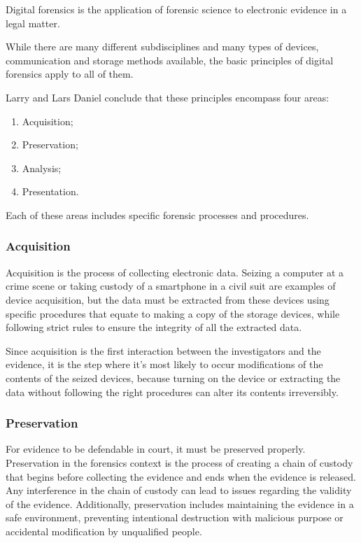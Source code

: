 Digital forensics is the application of forensic science to electronic evidence in a
legal matter.

While there are many different subdisciplines and many types of devices, communication
and storage methods available, the basic principles of digital forensics
apply to all of them.

Larry and Lars Daniel \cite{daniels} conclude that these principles encompass four areas:

\begin{enumerate}
\item Acquisition;
\item Preservation;
\item Analysis;
\item Presentation.
\end{enumerate}

Each of these areas includes specific forensic processes and procedures.

\subsubsection*{Acquisition}

Acquisition is the process of collecting electronic data. Seizing a computer at a crime scene or
taking custody of a smartphone in a civil suit are examples of device acquisition, but the data 
must be extracted from these devices using specific procedures that equate to making a copy of
the storage devices, while following strict rules to ensure the integrity of all the extracted data.

Since acquisition is the first interaction between the investigators and the evidence,
it is the step where it's most likely to occur modifications of the contents of the seized devices,
because turning on the device or extracting the data without following the right procedures can alter
its contents irreversibly.

\subsubsection*{Preservation}

For evidence to be defendable in court, it must be preserved properly.
Preservation in the forensics context is the process of creating a chain of custody \cite{custody}
that begins before collecting the evidence and ends when the evidence is released.
Any interference in the chain of custody can lead to issues regarding the validity of the evidence.
Additionally, preservation includes maintaining the evidence in a safe environment, preventing
intentional destruction with malicious purpose or accidental modification by unqualified people.

